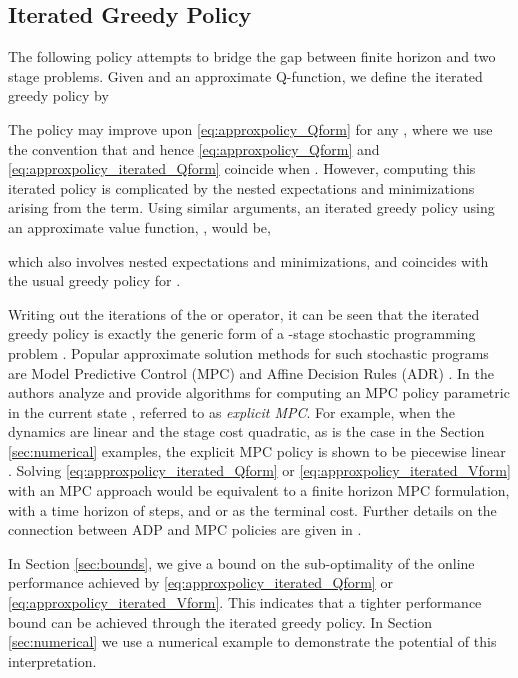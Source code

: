 \documentclass[journal]{IEEEtran}
\newcommand{\textQ}{Q}
\begin{document}
\subsection{Iterated Greedy Policy}  \label{sec:adp_improvedPolicy}

The following policy attempts to bridge the gap between finite horizon and two stage problems. Given  and an approximate \textQ-function, we define the iterated greedy policy by
	
The policy may improve upon \eqref{eq:approxpolicy_Qform} for any , where we use the convention that  and hence \eqref{eq:approxpolicy_Qform} and \eqref{eq:approxpolicy_iterated_Qform} coincide when .
However, computing this iterated policy is complicated by the nested expectations and minimizations arising from the  term. Using similar arguments, an iterated greedy policy using an approximate value function, , would be,
	
which also involves nested expectations and minimizations, and coincides with the usual greedy policy for .


Writing out the iterations of the  or  operator, it can be seen that the iterated greedy policy is exactly the generic form of a -stage stochastic programming problem \cite[section 3.1]{shapiro_2014_lectures_on_stoch_prog}.
Popular approximate solution methods for such stochastic programs are Model Predictive Control (MPC) \cite{rawlings_1999_MPCtextbook,camacho_2007_MPC} and Affine Decision Rules (ADR) \cite{ben-tal_adjustable_2004,angelos_2010_generalizedDR}.
In \cite{morari_2014_MPCBook} the authors analyze and provide algorithms for computing an MPC policy parametric in the current state , referred to as \emph{explicit MPC}. For example, when the dynamics are linear and the stage cost quadratic, as is the case in the Section \ref{sec:numerical} examples, the explicit MPC policy is shown to be piecewise linear \cite[\S 6.3]{morari_2014_MPCBook}.
Solving  \eqref{eq:approxpolicy_iterated_Qform} or \eqref{eq:approxpolicy_iterated_Vform} with an MPC approach would be equivalent to a finite horizon MPC formulation, with a time horizon of  steps, and  or  as the terminal cost.
Further details on the connection between ADP and MPC policies are given in \cite{bertsekas_2005_fromADPtoMPC}.


In Section \ref{sec:bounds}, we give a bound on the sub-optimality of the online performance achieved by \eqref{eq:approxpolicy_iterated_Qform} or \eqref{eq:approxpolicy_iterated_Vform}. This indicates that a tighter performance bound can be achieved through the iterated greedy policy. In Section \ref{sec:numerical} we use a numerical example to demonstrate the potential of this interpretation. 
\end{document}
